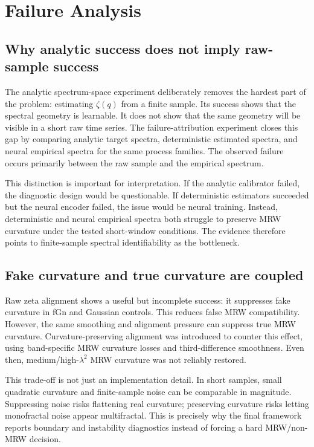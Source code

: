 \section{Failure Analysis}

\subsection{Why analytic success does not imply raw-sample success}

The analytic spectrum-space experiment deliberately removes the hardest part
of the problem: estimating \(\zeta(q)\) from a finite sample. Its success shows
that the spectral geometry is learnable. It does not show that the same
geometry will be visible in a short raw time series. The failure-attribution
experiment closes this gap by comparing analytic target spectra,
deterministic estimated spectra, and neural empirical spectra for the same
process families. The observed failure occurs primarily between the raw sample
and the empirical spectrum.

This distinction is important for interpretation. If the analytic calibrator
failed, the diagnostic design would be questionable. If deterministic
estimators succeeded but the neural encoder failed, the issue would be neural
training. Instead, deterministic and neural empirical spectra both struggle to
preserve MRW curvature under the tested short-window conditions. The evidence
therefore points to finite-sample spectral identifiability as the bottleneck.

\subsection{Fake curvature and true curvature are coupled}

Raw zeta alignment shows a useful but incomplete success: it suppresses fake
curvature in fGn and Gaussian controls. This reduces false MRW compatibility.
However, the same smoothing and alignment pressure can suppress true MRW
curvature. Curvature-preserving alignment was introduced to counter this
effect, using band-specific MRW curvature losses and third-difference
smoothness. Even then, medium/high-\(\lambda^2\) MRW curvature was not
reliably restored.

This trade-off is not just an implementation detail. In short samples, small
quadratic curvature and finite-sample noise can be comparable in magnitude.
Suppressing noise risks flattening real curvature; preserving curvature risks
letting monofractal noise appear multifractal. This is precisely why the final
framework reports boundary and instability diagnostics instead of forcing a
hard MRW/non-MRW decision.

